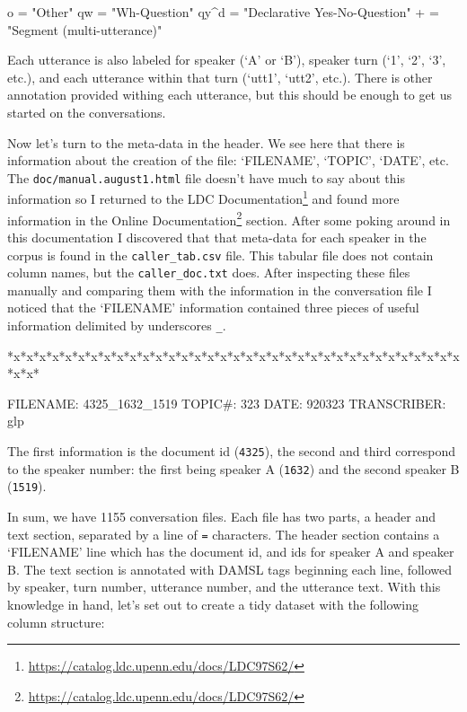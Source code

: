 \documentclass[
  letterpaper,
]{latex/krantz}
\newenvironment{Shaded}{\begin{snugshade}}{\end{snugshade}}
\newcommand{\NormalTok}[1]{\textcolor[rgb]{0.00,0.00,0.00}{#1}}
\DeclareRobustCommand{\href}[2]{#2\footnote{\url{#1}}}
\begin{document}
\begin{Shaded}
\begin{Highlighting}[]
\NormalTok{o = "Other"}
\NormalTok{qw = "Wh{-}Question"}
\NormalTok{qy\^{}d = "Declarative Yes{-}No{-}Question"}
\NormalTok{+ = "Segment (multi{-}utterance)"}
\end{Highlighting}
\end{Shaded}

Each utterance is also labeled for speaker (`A' or `B'), speaker turn
(`1', `2', `3', etc.), and each utterance within that turn (`utt1',
`utt2', etc.). There is other annotation provided withing each
utterance, but this should be enough to get us started on the
conversations.

Now let's turn to the meta-data in the header. We see here that there is
information about the creation of the file: `FILENAME', `TOPIC', `DATE',
etc. The \texttt{doc/manual.august1.html} file doesn't have much to say
about this information so I returned to the
\href{https://catalog.ldc.upenn.edu/docs/LDC97S62/}{LDC Documentation}
and found more information in the
\href{https://catalog.ldc.upenn.edu/docs/LDC97S62/}{Online
Documentation} section. After some poking around in this documentation I
discovered that that meta-data for each speaker in the corpus is found
in the \texttt{caller\_tab.csv} file. This tabular file does not contain
column names, but the \texttt{caller\_doc.txt} does. After inspecting
these files manually and comparing them with the information in the
conversation file I noticed that the `FILENAME' information contained
three pieces of useful information delimited by underscores \texttt{\_}.

\begin{Shaded}
\begin{Highlighting}[]
\NormalTok{*x*x*x*x*x*x*x*x*x*x*x*x*x*x*x*x*x*x*x*x*x*x*x*x*x*x*x*x*x*x*x*x*x*x*x*x*x*}


\NormalTok{FILENAME:   4325\_1632\_1519}
\NormalTok{TOPIC\#:     323}
\NormalTok{DATE:       920323}
\NormalTok{TRANSCRIBER:    glp}
\end{Highlighting}
\end{Shaded}

The first information is the document id (\texttt{4325}), the second and
third correspond to the speaker number: the first being speaker A
(\texttt{1632}) and the second speaker B (\texttt{1519}).

In sum, we have 1155 conversation files. Each file has two parts, a
header and text section, separated by a line of \texttt{=} characters.
The header section contains a `FILENAME' line which has the document id,
and ids for speaker A and speaker B. The text section is annotated with
DAMSL tags beginning each line, followed by speaker, turn number,
utterance number, and the utterance text. With this knowledge in hand,
let's set out to create a tidy dataset with the following column
structure:
\end{document}
